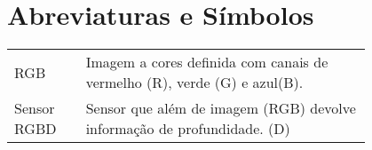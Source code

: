 \chapter*{Abreviaturas e Símbolos}

\begin{flushleft}
\begin{tabular}{l p{0.8\linewidth}}
	RGB & Imagem a cores definida com canais de vermelho (R), verde (G) e azul(B).\\
	Sensor RGBD & Sensor que além de imagem (RGB) devolve informação de profundidade. (D)\\

\end{tabular}
\end{flushleft}

